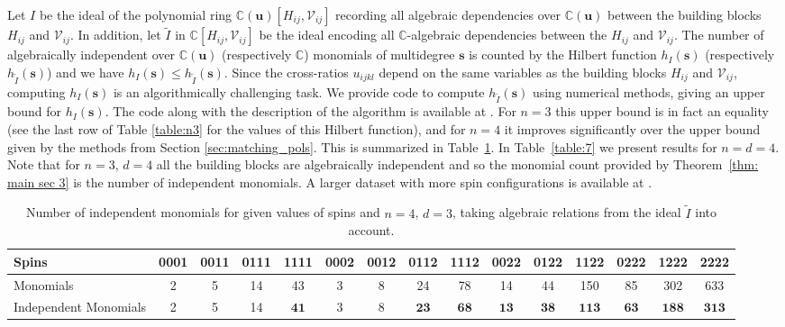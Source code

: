 \documentclass[12pt,a4paper]{extarticle}
\theoremstyle{definition}
\begin{document}
Let $I$ be the ideal of the polynomial ring $\mathbb{C}(\mathbf{u})[H_{ij},\mathcal{V}_{ij}]$ recording all algebraic dependencies over $\mathbb{C}(\mathbf{u})$ between the building blocks $H_{ij}$ and $\mathcal{V}_{ij}$. 
In addition, let $\tilde{I}$ in $\mathbb{C}[H_{ij},\mathcal{V}_{ij}]$ be the ideal encoding all $\mathbb{C}$-algebraic dependencies between the $H_{ij}$ and $\mathcal{V}_{ij}$.
The number of algebraically independent over $\mathbb{C}(\mathbf{u})$ (respectively $\mathbb{C}$) monomials of multidegree $\mathbf{s}$ is counted by the Hilbert function $h_I(\mathbf{s})$ (respectively~$h_{\tilde{I}}(\mathbf{s})$) and we have $h_I(\mathbf{s})\leq h_{\tilde{I}}(\mathbf{s})$. 
Since the cross-ratios $u_{ijkl}$ depend on the same variables as the building blocks $H_{ij}$ and $\mathcal{V}_{ij}$, computing $h_I(\mathbf{s})$ is an algorithmically challenging task.
We provide code to compute $h_{\tilde{I}}(\mathbf{s})$ using numerical methods, giving an upper bound for $h_I(\mathbf{s})$. The code along with the description of the algorithm is available at \cite{zenodo}. For $n=3$ this upper bound is in fact an equality (see the last row of Table \ref{table:n3} for the values of this Hilbert function), and for $n=4$ it improves significantly over the upper bound given by the methods from Section \ref{sec:matching_pols}. This is summarized in Table~\ref{table:6}. In Table~\ref{table:7} we present results for $n=d=4$. Note that for $n=3$, $d=4$ all the building blocks are algebraically independent and so the monomial count provided by Theorem~\ref{thm: main sec 3} is the number of independent monomials. A larger dataset with more spin configurations is available at \cite{zenodo}.

\begin{table}[h]
\centering
\small
\setlength{\tabcolsep}{3.5pt} 
\renewcommand{\arraystretch}{1.2}
\begin{tabular}{|p{2cm}|c|c|c|c|c|c|c|c|c|c|c|c|c|c|}
\hline
Spins 
& 0001 & 0011 & 0111 & 1111 
& 0002 & 0012 & 0112 & 1112 
& 0022 & 0122 & 1122 & 0222 & 1222 & 2222 \\
\hline
Monomials
& 2 & 5 & 14 & 43
& 3 & 8 & 24 & 78
& 14 & 44 & 150 & 85 & 302 & 633
\\
\hline
Independent Monomials
& 2 & 5 & 14 & $\mathbf{41}$
& 3 & 8 & $\mathbf{23}$ & $\mathbf{68}$
& $\mathbf{13}$ & $\mathbf{38}$ & $\mathbf{113}$ & $\mathbf{63}$ & $\mathbf{188}$ & $\mathbf{313}$ \\
\hline
\end{tabular}
\caption{Number of independent monomials for given values of spins and $n=4$, $d=3$, taking algebraic relations from the ideal $\tilde{I}$ into account.}\label{table:6}
\end{table}
\end{document}
